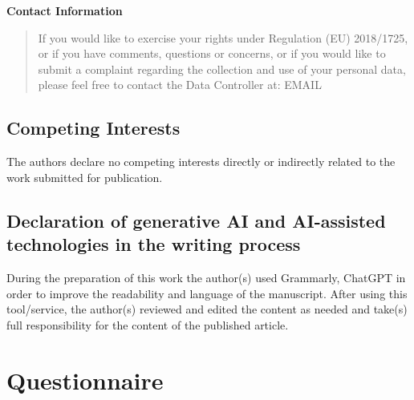 \documentclass[
  12pt,
]{article}
\begin{document}
\textbf{Contact Information}

\begin{quote}
If you would like to exercise your rights under Regulation (EU) 2018/1725, or if you have comments, questions or concerns, or if you would like to submit a complaint regarding the collection and use of your personal data, please feel free to contact the Data Controller at: EMAIL
\end{quote}

\subsection{Competing Interests}\label{competing-interests}

The authors declare no competing interests directly or indirectly related to the work submitted for publication.

\subsection{Declaration of generative AI and AI-assisted technologies in the writing process}\label{declaration-of-generative-ai-and-ai-assisted-technologies-in-the-writing-process}

During the preparation of this work the author(s) used Grammarly, ChatGPT in order to improve the readability and language of the manuscript. After using this tool/service, the author(s) reviewed and edited the content as needed and take(s) full responsibility for the content of the published article.

\newpage

\section{Questionnaire}\label{questionnaire}
\end{document}

